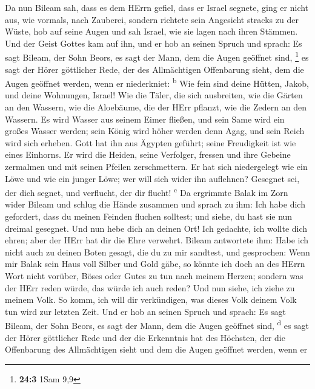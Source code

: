  Da nun Bileam sah, dass es dem HErrn gefiel, dass er
Israel segnete, ging er nicht aus, wie vormals, nach Zauberei, sondern
richtete sein Angesicht stracks zu der Wüste,  hob auf
seine Augen und sah Israel, wie sie lagen nach ihren Stämmen. Und der
Geist Gottes kam auf ihn,  und er hob an seinen Spruch und
sprach: Es sagt Bileam, der Sohn Beors, es sagt der Mann, dem die Augen
geöffnet sind, \footnote{\textbf{24:3} 1Sam 9,9}  es sagt
der Hörer göttlicher Rede, der des Allmächtigen Offenbarung sieht, dem
die Augen geöffnet werden, wenn er niederkniet: \textsuperscript{b}
 Wie fein sind deine Hütten, Jakob, und deine Wohnungen,
Israel!  Wie die Täler, die sich ausbreiten, wie die
Gärten an den Wassern, wie die Aloebäume, die der HErr pflanzt, wie die
Zedern an den Wassern.  Es wird Wasser aus seinem Eimer
fließen, und sein Same wird ein großes Wasser werden; sein König wird
höher werden denn Agag, und sein Reich wird sich erheben. 
Gott hat ihn aus Ägypten geführt; seine Freudigkeit ist wie eines
Einhorns. Er wird die Heiden, seine Verfolger, fressen und ihre Gebeine
zermalmen und mit seinen Pfeilen zerschmettern.  Er hat
sich niedergelegt wie ein Löwe und wie ein junger Löwe; wer will sich
wider ihn auflehnen? Gesegnet sei, der dich segnet, und verflucht, der
dir flucht! \textsuperscript{c}  Da ergrimmte Balak im
Zorn wider Bileam und schlug die Hände zusammen und sprach zu ihm: Ich
habe dich gefordert, dass du meinen Feinden fluchen solltest; und siehe,
du hast sie nun dreimal gesegnet.  Und nun hebe dich an
deinen Ort! Ich gedachte, ich wollte dich ehren; aber der HErr hat dir
die Ehre verwehrt.  Bileam antwortete ihm: Habe ich nicht
auch zu deinen Boten gesagt, die du zu mir sandtest, und gesprochen:
 Wenn mir Balak sein Haus voll Silber und Gold gäbe, so
könnte ich doch an des HErrn Wort nicht vorüber, Böses oder Gutes zu tun
nach meinem Herzen; sondern was der HErr reden würde, das würde ich auch
reden?  Und nun siehe, ich ziehe zu meinem Volk. So komm,
ich will dir verkündigen, was dieses Volk deinem Volk tun wird zur
letzten Zeit.  Und er hob an seinen Spruch und sprach: Es
sagt Bileam, der Sohn Beors, es sagt der Mann, dem die Augen geöffnet
sind, \textsuperscript{d}  es sagt der Hörer göttlicher
Rede und der die Erkenntnis hat des Höchsten, der die Offenbarung des
Allmächtigen sieht und dem die Augen geöffnet werden, wenn er
